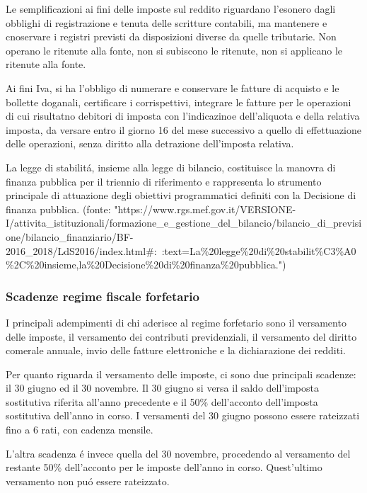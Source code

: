 \documentclass{article}
\begin{document}
Le semplificazioni ai fini delle imposte sul reddito riguardano l'esonero dagli obblighi di registrazione e tenuta delle scritture contabili, ma mantenere e cnoservare i registri previsti da disposizioni diverse da quelle tributarie.
Non operano le ritenute alla fonte, non si subiscono le ritenute, non si applicano le ritenute alla fonte. 

Ai fini Iva, si ha l'obbligo di numerare e conservare le fatture di acquisto e le bollette doganali, certificare i corrispettivi, 
integrare le fatture per le operazioni di cui risultatno debitori di imposta con l'indicazinoe dell'aliquota e della relativa imposta, da versare entro il giorno 16 del mese successivo a quello di effettuazione delle operazioni, senza diritto alla detrazione dell'imposta relativa.

La legge di stabilit\'a, insieme alla legge di bilancio, costituisce la manovra di finanza pubblica per il triennio di riferimento
e rappresenta lo strumento principale di attuazione degli obiettivi programmatici definiti con la Decisione di finanza pubblica. (fonte: "https://www.rgs.mef.gov.it/VERSIONE-I/attivita_istituzionali/formazione_e_gestione_del_bilancio/bilancio_di_previsione/bilancio_finanziario/BF-2016_2018/LdS2016/index.html#:~:text=La\%20legge\%20di\%20stabilit\%C3\%A0\%2C\%20insieme,la\%20Decisione\%20di\%20finanza\%20pubblica.")

\subsubsection{Scadenze regime fiscale forfetario}

\begin{comment}
    tema imposte
    tema contributi
\end{comment}

I principali adempimenti di chi aderisce al regime forfetario sono il versamento delle imposte, il versamento dei contributi previdenziali, il versamento del diritto comerale annuale, 
invio delle fatture elettroniche e la dichiarazione dei redditi.

Per quanto riguarda il versamento delle imposte, ci sono due principali scadenze: il 30 giugno ed il 30 novembre.
Il 30 giugno si versa il saldo dell'imposta sostitutiva riferita all'anno precedente e il 50\% dell'acconto dell'imposta sostitutiva dell'anno in corso. I versamenti del 30 giugno possono essere rateizzati fino a 6 rati, con cadenza mensile.

L'altra scadenza \'e invece quella del 30 novembre, procedendo al versamento del restante 50\% dell'acconto per le imposte dell'anno in corso. Quest'ultimo versamento non pu\'o essere rateizzato.
\end{document}
